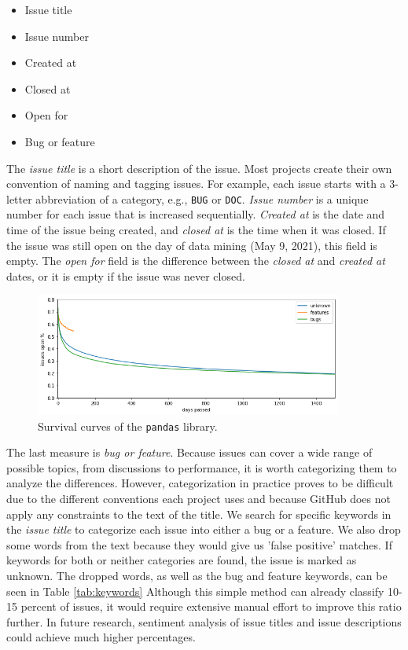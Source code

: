 \begin{itemize}
    \item Issue title
    \item Issue number
    \item Created at
    \item Closed at
    \item Open for
    \item Bug or feature
\end{itemize}

The \textit{issue title} is a short description of the issue. Most projects create their own convention of naming and tagging issues. For example, each issue starts with a 3-letter abbreviation of a category, e.g., \texttt{BUG} or \texttt{DOC}. \textit{Issue number} is a unique number for each issue that is increased sequentially. \textit{Created at} is the date and time of the issue being created, and \textit{closed at} is the time when it was closed. If the issue was still open on the day of data mining (May 9, 2021), this field is empty. The \textit{open for} field is the difference between the \textit{closed at} and \textit{created at} dates, or it is empty if the issue was never closed.

\begin{figure}
    \centering
    \includegraphics[width=0.9\textwidth]{figures/issues_open.png}
    \caption{Survival curves of the \texttt{pandas} library.}
    \label{fig:survival}
\end{figure}

The last measure is \textit{bug or feature}. Because issues can cover a wide range of possible topics, from discussions to performance, it is worth categorizing them to analyze the differences. However, categorization in practice proves to be difficult due to the different conventions each project uses and because GitHub does not apply any constraints to the text of the title. We search for specific keywords in the \textit{issue title} to categorize each issue into either a bug or a feature. We also drop some words from the text because they would give us 'false positive' matches. If keywords for both or neither categories are found, the issue is marked as unknown. The dropped words, as well as the bug and feature keywords, can be seen in Table \ref{tab:keywords} Although this simple method can already classify 10-15 percent of issues, it would require extensive manual effort to improve this ratio further. In future research, sentiment analysis of issue titles and issue descriptions could achieve much higher percentages.


